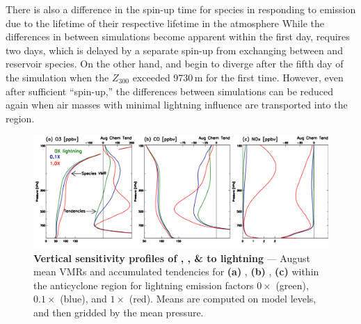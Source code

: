 There is also a difference in the spin-up time for species in responding to {\lnox} emission due to the lifetime of their respective lifetime in
the atmosphere While the differences in  between simulations become apparent within the first day,  requires 
two days, which is delayed by a separate spin-up from exchanging between  and reservoir species. On the other hand,
 and  begin to diverge after the fifth day of the simulation when the $Z_{300}$ exceeded 9730\,\unit{m} for the first
time.  However, even after sufficient ``spin-up,'' the differences between simulations can be reduced again when air masses with minimal lightning
influence are transported into the region.




	\begin{figure}[t!]
		\centering
		\includegraphics[width=1.0\textwidth]{sens/ltngsens_vert.png}
		\caption[Vertical sensitivity profiles of , , \&  to lightning]{\textbf{Vertical
		sensitivity profiles of , , \&  to lightning} --- August mean VMRs and
		accumulated tendencies for {\bf(a)} , {\bf(b)} , {\bf(c)}  within the anticyclone
		region for lightning emission factors $0\times$ (green), $0.1\times$ (blue), and $1\times$ (red). Means are
		computed on model levels, and then gridded by the mean pressure.
		\label{fig:2006/ltngsens_vertical} }\vspace{-.3in}
	\end{figure}


